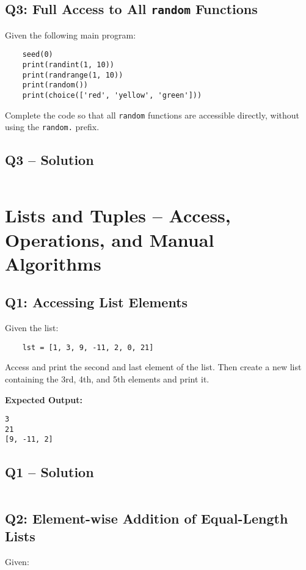 \documentclass[a4paper,11pt]{article}
\begin{document}
\subsection*{Q3: Full Access to All \texttt{random} Functions}
Given the following main program:

\begin{verbatim}
	seed(0)
	print(randint(1, 10))
	print(randrange(1, 10))
	print(random())
	print(choice(['red', 'yellow', 'green']))
\end{verbatim}

Complete the code so that all \texttt{random} functions are accessible directly, without using the \texttt{random.} prefix.


\subsection*{Q3 – Solution}
\inputminted{python}{Files/6/3.py}


\section{Lists and Tuples – Access, Operations, and Manual Algorithms}

\subsection*{Q1: Accessing List Elements}
Given the list:

\begin{verbatim}
	lst = [1, 3, 9, -11, 2, 0, 21]
\end{verbatim}

Access and print the second and last element of the list. Then create a new list containing the 3rd, 4th, and 5th elements and print it.

\textbf{Expected Output:}
\begin{flushleft}
	\texttt{3}\\
	\texttt{21}\\
	\texttt{[9, -11, 2]}
\end{flushleft}

\subsection*{Q1 – Solution}
\inputminted{python}{Files/7/1.py}

\subsection*{Q2: Element-wise Addition of Equal-Length Lists}
Given:
\end{document}
